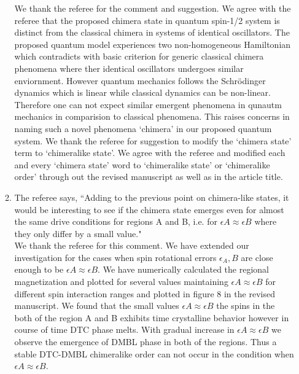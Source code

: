 \documentclass[aps,prb,reprint,showpacs,floatfix,superscriptaddress, onecolumn, nofootinbib, 10pt]{revtex4-2}
\newcommand{\response}[1]{{\color{black}#1}} %
\newcommand{\comment}[1]{{\color{blue}#1}} %
\begin{document}
\begin{enumerate}
\begin{enumerate}
			\response{We thank the referee for the comment and suggestion. We agree with the referee that the proposed chimera state in quantum spin-1/2 system is distinct from the classical chimera in systems of identical oscillators. The proposed quantum model experiences two non-homogeneous Hamiltonian which contradicts with basic criterion for generic classical chimera phenomena where ther identical oscillators undergoes similar enviornment. However quantum mechanics follows the Schr\"{o}dinger dynamics which is linear while classical dynamics can be non-linear. Therefore one can not expect similar emergent phenomena in qunautm mechanics in comparision to classical phenomena. This raises concerns in naming such a novel phenomena `chimera' in our proposed quantum system. We thank the referee for suggestion to modify the `chimera state' term to `chimeralike state'. We agree with the referee and modified each and every `chimera state' word to `chimeralike state' or `chimeralike order' through out the revised manuscript as well as in the article title.}
		
		\item The referee says, \comment{``Adding to the previous point on chimera-like states, it would be interesting to see if the chimera state emerges even for almost the same drive conditions for regions A and B, i.e. for $\epsilon A \approx \epsilon B$ where they only differ by a small value."}\\
		
		\response{We thank the referee for this comment. We have extended our investigation for the cases when spin rotational errors $\epsilon_A,B$ are close enough to be $\epsilon A \approx \epsilon B$. We have numerically calculated the regional magnetization and plotted for several values maintaining $\epsilon A \approx \epsilon B$ for different spin interaction ranges and plotted in figure 8 in the revised manuscript.
		We found that the small values $\epsilon A \approx \epsilon B$ the spins in the both of the region A and B exhibits time crystalline behavior however in course of time DTC phase melts. With gradual increase in $\epsilon A \approx \epsilon B$ we observe the emergence of DMBL phase in both of the regions. Thus a stable DTC-DMBL chimeralike order can not occur in the condition when $\epsilon A \approx \epsilon B$.} \\
	

\end{enumerate}
\end{enumerate}
\end{document}
